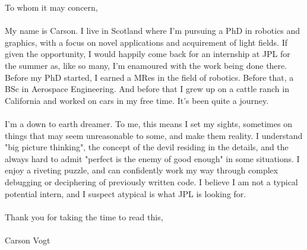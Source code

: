 \documentclass[12pt]{report}
\begin{document}
\noindent To whom it may concern,
\\ \\
My name is Carson. I live in Scotland where I'm pursuing a PhD in robotics and graphics, with a focus on novel applications and acquirement of light fields. If given the opportunity, I would happily come back for an internship at JPL for the summer as, like so many, I'm enamoured with the work being done there. Before my PhD started, I earned a MRes in the field of robotics. Before that, a BSc in Aerospace Engineering. And before that I grew up on a cattle ranch in California and worked on cars in my free time. It's been quite a journey.
\\ \\ 
I'm a down to earth dreamer. To me, this means I set my sights, sometimes on things that may seem unreasonable to some, and make them reality. I understand "big picture thinking", the concept of the devil residing in the details, and the always hard to admit "perfect is the enemy of good enough" in some situations. I enjoy a riveting puzzle, and can confidently work my way through complex debugging or deciphering of previously written code. I believe I am not a typical potential intern, and I suspect atypical is what JPL is looking for.
\\ \\
Thank you for taking the time to read this,
\\ \\
Carson Vogt
\end{document}
